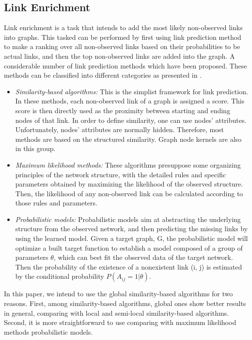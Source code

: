 \documentclass[runningheads,a4paper]{llncs}
\begin{document}
\subsection{Link Enrichment}
\label{link-enrichment}
Link enrichment is a task that intends to add the most likely non-observed links into graphs. This tasked can be performed by first using link prediction method to make a ranking over all non-observed links based on their probabilities to be actual links, and then the top non-observed links are added into the graph. A considerable number of link prediction methods which have been proposed. These methods can be classified into different categories as presented in \cite{jour2}. 
\begin{itemize}
\item \textit{Similarity-based algorithms:} This is the simplist framework for link prediction. In these methods, each non-observed link of a graph is assigned a score. This score is then directly used as the proximity between starting and ending nodes of that link. In order to define similarity, one can use nodes' attributes. Unfortunately, nodes' attributes are normally hidden. Therefore, most methods are based on the structured similarity. Graph node kernels are also in this group.

\item \textit{Maximum likelihood methods:} These algorithms presuppose some organizing principles of the network structure, with the detailed rules and specific parameters obtained by maximizing the likelihood of the observed structure. Then, the likelihood of any non-observed link can be calculated according to
those rules and parameters.

\item \textit{Probabilistic models:} Probabilistic models aim at abstracting the underlying structure from the observed network, and then predicting the missing links by using the learned model. Given a target graph, G, the probabilistic model will optimize a built target function to establish a model composed of a group of parameters $\theta$, which can best fit the observed data of the target network. Then the probability of the existence of a nonexistent link (i, j) is estimated by the conditional probability $P(A_{ij} = 1|\theta)$.

\end{itemize}
In this paper, we intend to use the global similarity-based algorithms for two reasons. First, among similarity-based algorithms, global ones show better results in general, comparing with local and semi-local similarity-based algorithms. Second, it is more straightforward to use comparing with maximum likelihood methods probabilistic models.
\end{document}
